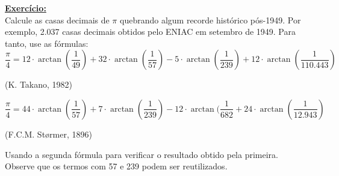 \documentclass[a4paper, 12pt]{article}
\begin{document}
\noindent\textbf{\underline{Exercício:}} \\
Calcule as casas decimais de \(\pi\) quebrando algum recorde histórico pós-1949. Por exemplo, 2.037 casas decimais obtidos pelo ENIAC em setembro de 1949. Para tanto, use as fórmulas:
\[
\frac{\pi}{4} = 12 \cdot \arctan(\frac{1}{49}) + 32 \cdot \arctan(\frac{1}{57}) - 5 \cdot \arctan(\frac{1}{239}) + 12 \cdot \arctan(\frac{1}{110.443})
\]
\begin{center}
    (K. Takano, 1982)
\end{center}
\[
\frac{\pi}{4} = 44 \cdot \arctan(\frac{1}{57}) + 7 \cdot \arctan(\frac{1}{239}) - 12 \cdot \arctan(\frac{1}{682} + 24 \cdot \arctan(\frac{1}{12.943})
\]
\begin{center}
    (F.C.M. Størmer, 1896)
\end{center}
Usando a segunda fórmula para verificar o resultado obtido pela primeira. Observe que os termos com 57 e 239 podem ser reutilizados.
\end{document}
